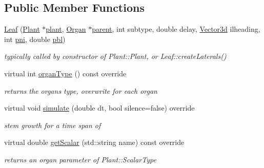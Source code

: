 \subsection*{Public Member Functions}
\begin{DoxyCompactItemize}
\item 
\hyperlink{classCPlantBox_1_1Leaf_a00707cb127c0c09df6b63a5be0d3a35e}{Leaf} (\hyperlink{classCPlantBox_1_1Plant}{Plant} $\ast$\hyperlink{classCPlantBox_1_1Organ_ac614456886ab270c6fd2617403e0f306}{plant}, \hyperlink{classCPlantBox_1_1Organ}{Organ} $\ast$\hyperlink{classCPlantBox_1_1Organ_a8ad90078d5ef859bd2ab71700854e286}{parent}, int subtype, double delay, \hyperlink{classCPlantBox_1_1Vector3d}{Vector3d} ilheading, int \hyperlink{classCPlantBox_1_1Leaf_a533cb09f68a86c55321b2b28e3f8085a}{pni}, double \hyperlink{classCPlantBox_1_1Leaf_a7c503767ee8008fb9555f1f4590435c5}{pbl})
\begin{DoxyCompactList}\small\item\em typically called by constructor of Plant\+::\+Plant, or Leaf\+::create\+Laterals() \end{DoxyCompactList}\item 
\mbox{\label{classCPlantBox_1_1Leaf_af7556eb19d907b277e314e09dce849de}} 
virtual int \hyperlink{classCPlantBox_1_1Leaf_af7556eb19d907b277e314e09dce849de}{organ\+Type} () const override
\begin{DoxyCompactList}\small\item\em returns the organs type, overwrite for each organ \end{DoxyCompactList}\item 
virtual void \hyperlink{classCPlantBox_1_1Leaf_ac8f35a92020107f44059b995e44af5d6}{simulate} (double dt, bool silence=false) override
\begin{DoxyCompactList}\small\item\em stem growth for a time span of \end{DoxyCompactList}\item 
\mbox{\label{classCPlantBox_1_1Leaf_a97bb6cc92a59f0d137eb6b497b5d376e}} 
virtual double \hyperlink{classCPlantBox_1_1Leaf_a97bb6cc92a59f0d137eb6b497b5d376e}{get\+Scalar} (std\+::string name) const override
\begin{DoxyCompactList}\small\item\em returns an organ parameter of Plant\+::\+Scalar\+Type \end{DoxyCompactList}\item 

\end{DoxyCompactItemize}
